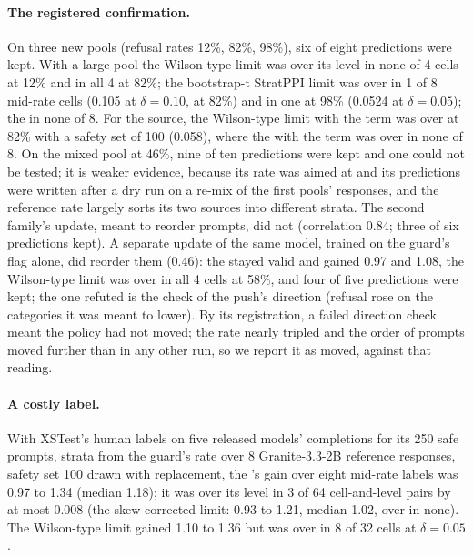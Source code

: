 \begin{table}[t]
\centering
\scriptsize
\setlength{\tabcolsep}{3pt}

\caption{Reference-rate strata at $\delta=0.05$: largest miss over checkpoints; ESS against a random split with a
pooled Wilson bound. The rates are those of these draws; the first-pools paragraph quotes an earlier measurement of the same labels, from the estimate at $\delta=0.10$, whose rates differ by a point. Bold: more than two Monte Carlo standard errors over $\delta$ (above 0.0562 at 5,000 draws a cell;
the two cells nearest it carry a fourth digit).}
\label{tab:stratppi}
\end{table}

\paragraph{The registered confirmation.} On three new pools (refusal rates 12\%, 82\%, 98\%), six of eight predictions
were kept. With a large pool the Wilson-type limit was over its level in none of 4 cells at 12\% and in all 4 at 82\%;
the bootstrap-t StratPPI limit was over in 1 of 8 mid-rate cells (0.105 at $\delta=0.10$, at 82\%) and in one at 98\%
(0.0524 at $\delta=0.05$); the \SWT{} in none of 8. For the source, the Wilson-type limit with the term was over at 82\%
with a safety set of 100 (0.058), where the \SWT{} with the term was over in none of 8. On the mixed pool at 46\%, nine of
ten predictions were kept and one could not be tested; it is weaker evidence, because its rate was aimed at and its
predictions were written after a dry run on a re-mix of the first pools' responses, and the reference rate largely
sorts its two sources into different strata. The second family's update, meant to reorder prompts, did not
(correlation 0.84; three of six predictions kept). A separate update of the same model, trained on the guard's flag
alone, did reorder them
(0.46): the \SWT{} stayed valid and gained 0.97 and 1.08, the Wilson-type limit was over in all 4 cells at 58\%, and four of
five predictions were kept; the one refuted is the check of the push's direction (refusal rose on the categories it was
meant to lower). By its registration, a failed direction check meant the policy had not moved; the rate nearly tripled
and the order of prompts moved further than in any other run, so we report it as moved, against that reading.

\paragraph{A costly label.} With XSTest's human labels on five released models' completions for its 250 safe prompts,
strata from the guard's rate over 8 Granite-3.3-2B reference responses, safety set 100 drawn with replacement, the
\SWT{}'s gain over eight mid-rate labels was 0.97 to 1.34 (median 1.18); it was over its level in 3 of 64 cell-and-level pairs by at most
0.008 (the skew-corrected limit: 0.93 to 1.21, median 1.02, over in none). The Wilson-type limit gained 1.10 to 1.36 but was over in 8 of 32 cells at $\delta=0.05$.

